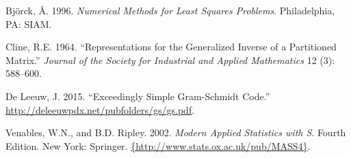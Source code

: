 \documentclass[12pt,]{article}
\begin{document}
\hypertarget{ref-bjorck_96}{}
Björck, Å. 1996. \emph{Numerical Methods for Least Squares Problems}.
Philadelphia, PA: SIAM.

\hypertarget{ref-cline_64}{}
Cline, R.E. 1964. ``Representations for the Generalized Inverse of a
Partitioned Matrix.'' \emph{Journal of the Society for Industrial and
Applied Mathematics} 12 (3): 588--600.

\hypertarget{ref-deleeuw_E_15c}{}
De Leeuw, J. 2015. ``Exceedingly Simple Gram-Schmidt Code.''
\url{http://deleeuwpdx.net/pubfolders/gs/gs.pdf}.

\hypertarget{ref-venables_ripley_02}{}
Venables, W.N., and B.D. Ripley. 2002. \emph{Modern Applied Statistics
with S}. Fourth Edition. New York: Springer.
\href{\%7Bhttp://www.stats.ox.ac.uk/pub/MASS4\%7D}{\{http://www.stats.ox.ac.uk/pub/MASS4\}}.
\end{document}
